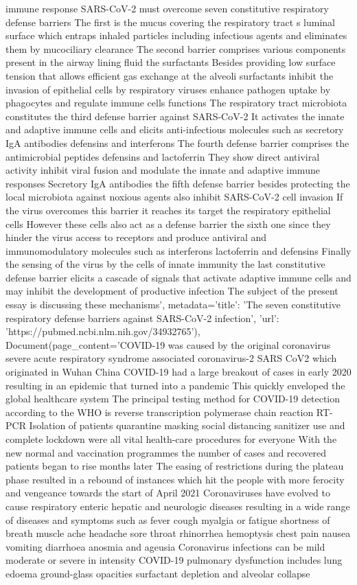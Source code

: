 immune response SARS-CoV-2 must overcome seven constitutive respiratory defense barriers The first is the mucus covering the respiratory tract s luminal surface which entraps inhaled particles including infectious agents and eliminates them by mucociliary clearance The second barrier comprises various components present in the airway lining fluid the surfactants Besides providing low surface tension that allows efficient gas exchange at the alveoli surfactants inhibit the invasion of epithelial cells by respiratory viruses enhance pathogen uptake by phagocytes and regulate immune cells functions The respiratory tract microbiota constitutes the third defense barrier against SARS-CoV-2 It activates the innate and adaptive immune cells and elicits anti-infectious molecules such as secretory IgA antibodies defensins and interferons The fourth defense barrier comprises the antimicrobial peptides defensins and lactoferrin They show direct antiviral activity inhibit viral fusion and modulate the innate and adaptive immune responses Secretory IgA antibodies the fifth defense barrier besides protecting the local microbiota against noxious agents also inhibit SARS-CoV-2 cell invasion If the virus overcomes this barrier it reaches its target the respiratory epithelial cells However these cells also act as a defense barrier the sixth one since they hinder the virus access to receptors and produce antiviral and immunomodulatory molecules such as interferons lactoferrin and defensins Finally the sensing of the virus by the cells of innate immunity the last constitutive defense barrier elicits a cascade of signals that activate adaptive immune cells and may inhibit the development of productive infection The subject of the present essay is discussing these mechanisms', metadata={'title': 'The seven constitutive respiratory defense barriers against SARS-CoV-2 infection', 'url': 'https://pubmed.ncbi.nlm.nih.gov/34932765'}), Document(page\_content='COVID-19 was caused by the original coronavirus severe acute respiratory syndrome associated coronavirus-2 SARS CoV2 which originated in Wuhan China COVID-19 had a large breakout of cases in early 2020 resulting in an epidemic that turned into a pandemic This quickly enveloped the global healthcare system The principal testing method for COVID-19 detection according to the WHO is reverse transcription polymerase chain reaction RT-PCR Isolation of patients quarantine masking social distancing sanitizer use and complete lockdown were all vital health-care procedures for everyone With the new normal and vaccination programmes the number of cases and recovered patients began to rise months later The easing of restrictions during the plateau phase resulted in a rebound of instances which hit the people with more ferocity and vengeance towards the start of April 2021 Coronaviruses have evolved to cause respiratory enteric hepatic and neurologic diseases resulting in a wide range of diseases and symptoms such as fever cough myalgia or fatigue shortness of breath muscle ache headache sore throat rhinorrhea hemoptysis chest pain nausea vomiting diarrhoea anosmia and ageusia Coronavirus infections can be mild moderate or severe in intensity COVID-19 pulmonary dysfunction includes lung edoema ground-glass opacities surfactant depletion and alveolar collapse 
